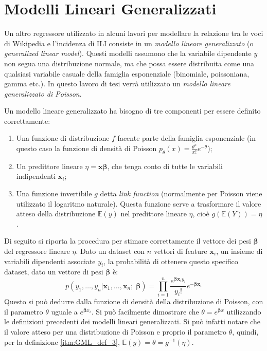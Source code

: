 \section{Modelli Lineari Generalizzati}
\bigskip

Un altro regressore utilizzato in alcuni lavori \cite{McIver2014} per modellare la relazione tra le voci di Wikipedia e l'incidenza di ILI consiste 
in un \textit{modello lineare generalizzato}\cite{GLM} (o \textit{generalized linear model}). Questi modelli assumono che la variabile 
dipendente $y$ non segua una distribuzione normale, ma che possa essere distribuita come una qualsiasi variabile casuale 
della famiglia esponenziale (binomiale, poissoniana, gamma etc.). In questo lavoro di tesi verrà utilizzato un 
\textit{modello lineare generalizzato di Poisson}. 
\bigskip
 
Un modello lineare generalizzato ha bisogno di tre componenti per essere definito correttamente:
\begin{enumerate}
\item Una funzione di distribuzione $f$ facente parte della famiglia esponenziale (in questo caso la funzione di densità di Poisson $p_{\theta}(x) = \frac{\theta^{x}}{x!}e^{-\theta}$);
\item Un predittore lineare $\eta = \bm{x\beta}$, che tenga conto di tutte le variabili indipendenti $\bm{x}_i$;
\item Una funzione invertibile $g$ detta \textit{link function} (normalmente per Poisson viene utilizzato il logaritmo naturale). Questa funzione serve a trasformare il valore atteso della distribuzione $\mathbb{E}(y)$ nel predittore lineare $\eta$, cioè $g(\mathbb{E}(Y)) = \eta$ \label{itm:GML_def_3}.
\end{enumerate}

Di seguito si riporta la procedura per stimare correttamente il vettore dei pesi $\bm{\beta}$ del regressore lineare $\eta$. 
Dato un dataset con $n$ vettori di feature $\bm{x}_i$, un insieme di variabili dipendenti 
associate $y_i$, la probabilità di ottenere questo specifico dataset, dato un vettore di pesi $\bm{\beta}$ è:
\begin{equation}
p(y_1,\ldots,y_n | \bm{x}_1,\ldots,\bm{x}_n; \; \bm{\beta}) = \prod_{i=1}^n \frac{e^{\bm{\beta}\bm{x}_iy_i}}{y_i!}e^{-\bm{\beta}\bm{x}_i} \label{eq:GLM_Poisson}
\end{equation}
Questo si può dedurre dalla funzione di densità della distribuzione di Poisson, con il parametro $\theta$ uguale a $e^{\bm{\beta}x_i}$. Si può facilmente dimostrare che $\theta=e^{\bm{\beta}x}$ utilizzando le definizioni precedenti dei modelli lineari generalizzati. Si può infatti notare che il valore atteso per una distribuzione di Poisson e proprio il parametro $\theta$, quindi, per la definizione \ref{itm:GML_def_3}, $\mathbb{E}(y) = \theta = g^{-1}(\eta)$.
\bigskip

